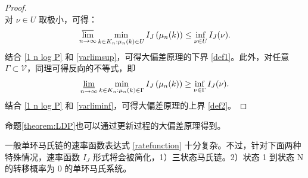 \begin{proof}
\begin{equation*}
\end{equation*}
对 $\nu\in U$ 取极小，可得：
\begin{equation}\label{varlimsup}
\varlimsup_{n\to\infty}\min_{k\in K_n: \mu_n(k) \in U}I_J\left(\mu_{n}(k)\right)\le \inf_{\nu\in U}I_J(\nu).
\end{equation}
结合 \eqref{1 n log P} 和 \eqref{varlimsup}，可得大偏差原理的下界 \eqref{def1}。此外，对任意$\Gamma \subset \mathcal{V}$，同理可得反向的不等式，即
\begin{equation}\label{varliminf}
\varliminf_{n\to\infty}\min_{k\in K_n: \mu_n(k) \in \Gamma}I_J\left(\mu_{n}(k)\right)\ge \inf_{\nu\in \Gamma}I_J(\nu).
\end{equation}
结合 \eqref{1 n log P} 和 \eqref{varliminf}，可得大偏差原理的上界 \eqref{def2}。
\end{proof}
命题\ref{theorem:LDP}也可以通过更新过程的大偏差原理得到。

一般单环马氏链的速率函数表达式 \eqref{ratefunction} 十分复杂。不过，针对下面两种特殊情况，速率函数 $I_J$ 形式将会被简化，1）三状态马氏链。2）状态 1 到状态 N 的转移概率为 0 的单环马氏系统。

